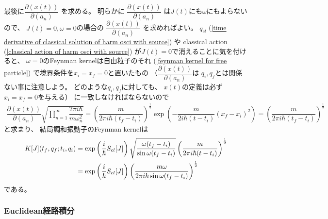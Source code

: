 最後に$\dfrac{ \partial ( x(t) ) }{ \partial (a_n) }$
を求める。
明らかに
$\dfrac{ \partial ( x(t) ) }{ \partial (a_n) }$
は$J(t)$にも$\omega$にもよらないので、
$J(t) = 0, \omega = 0$の場合の
$\dfrac{ \partial ( x(t) ) }{ \partial (a_n) }$
を求めればよい。
$\dot{q}_{cl}$
(\ref{time derivative of classical solution of harm osci with source})
や
classical action
(\ref{classical action of harm osci with source})
が$J(t) = 0$で消えることに気を付けると、
$\omega = 0$のFeynman kernelは自由粒子のそれ
(\ref{feynman kernel for free particle})
で境界条件を$x_i = x_f = 0$と置いたもの
（$\dfrac{ \partial ( x(t) ) }{ \partial (a_n) }$は
$q_i, q_f$とは関係ない事に注意しよう。
どのような$q_i, q_f$に対しても、
$x(t)$の定義は必ず$x_i = x_f = 0$を与える）
に一致しなければならないので
\begin{align}
    \dfrac{ \partial ( x(t) ) }{ \partial (a_n) }
    \sqrt{
        \prod_{n=1}^\infty
        \dfrac{
            2 \pi i \hbar
        }{
            m \omega_n^2
        }
    }
    =
    \left(
        \dfrac{ m }{ 2 \pi i \hbar ( t_f - t_i ) }
    \right)^{\frac{1}{2}}
    \exp\left(
        -
        \dfrac{ m }{ 2 i \hbar (t - t_i) }
        (x_f - x_i)^2
    \right)
    =
    \left(
        \dfrac{ m }{ 2 \pi i \hbar ( t_f - t_i ) }
    \right)^{\frac{1}{2}}
\end{align}
と求まり、
結局調和振動子のFeynman kernelは
\begin{align}
    K[J]( t_f, q_f ; t_i, q_i )
    &=
    \exp\left(
        \dfrac{i}{\hbar} S_{cl} [J]
    \right)
    \sqrt{
        \dfrac{
            \omega (t_f - t_i)
        }{
            \sin \omega (t_f - t_i)
        }
    }
    \left(
        \dfrac{ m }{ 2 \pi i \hbar ( t - t_i ) }
    \right)^{\frac{1}{2}}
\notag\\&=
    \exp\left(
        \dfrac{i}{\hbar} S_{cl} [J]
    \right)
    \left(
        \dfrac{ 
            m \omega
        }{
            2 \pi i \hbar
            \sin \omega (t_f - t_i)
        }
    \right)^{\frac{1}{2}}
\label{feynman kernel of harmonic oscillator with source}
\end{align}
である。

\subsubsection{Euclidean経路積分}

